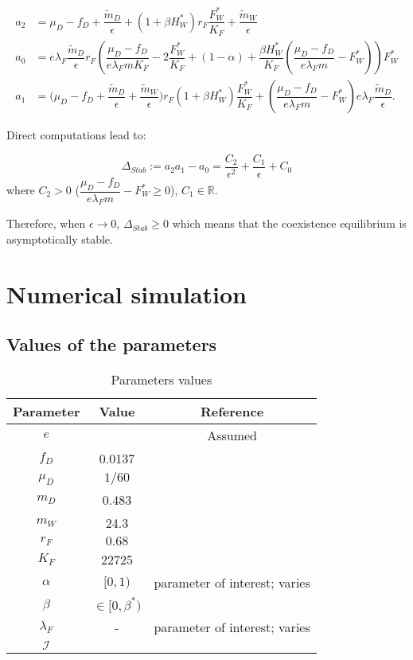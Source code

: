 \documentclass{article}
\newcommand{\lfw}{\lambda_{F}}
\newcommand{\lfw}{\lambda_{F}}
\begin{document}
\begin{align*}
a_2  &= \mu_D - f_D + \dfrac{\tilde m_D}{\epsilon} + (1+\beta H_W^*)r_F \dfrac{F_W^*}{K_F} + \dfrac{\tilde m_W}{\epsilon} \\
a_0 &= e \lfw \dfrac{\tilde m_D}{\epsilon} r_F \left(\dfrac{\mu_D -f_D }{e \lfw m K_F} - 2\dfrac{F_W^*}{K_F} + (1-\alpha) + \dfrac{\beta H_W^*}{K_F} \left(\dfrac{\mu_D -f_D }{e \lfw m} - F_W^*\right) \right) F_W^* \\
a_1 &= \Big( \mu_D  -f_D + \dfrac{\tilde m_D}{\epsilon} + \dfrac{\tilde m_W}{\epsilon} \Big) r_F(1+ \beta H_W^*) \dfrac{F^*_W}{K_F} + \left(\dfrac{\mu_D -f_D}{e\lfw m} - F_W^*\right) e \lfw \dfrac{\tilde m_D}{\epsilon}.
\end{align*}

Direct computations lead to:

\begin{equation*}
\Delta_{Stab} := a_2 a_1 - a_0 = \dfrac{C_2}{\epsilon^2} + \dfrac{C_1}{\epsilon} + C_0
\end{equation*}
where $C_2 > 0$ ($\dfrac{\mu_D -f_D}{e\lfw m} - F_W^* \geq 0$), $C_1 \in \mathbb{R}$.


Therefore, when $\epsilon \rightarrow 0$, $\Delta_{Stab} \geq 0$ which means that the coexistence equilibrium is asymptotically stable.









\section{Numerical simulation}

\subsection{Values of the parameters}

\begin{table}[ht]
\centering
\begin{tabular}{|c|c|c|}
\hline 
Parameter & Value & Reference \\ 
\hline 
$e$ & & Assumed\\
$f_D$ & 0.0137 & \cite{koppert_consommation_1996}\\
$\mu_D$ & $1/60$ & \cite{ins_demographie}\\
$m_D$ & 0.483 & \cite{avila_interpreting_2019}\\
$m_W$ & 24.3 & \cite{avila_interpreting_2019}\\
$r_F$ & $0.68$ & \cite{robinson_intrinsic_1986}\\
$K_F$ & 22725 & \cite{janson_ecological_1990} \\
$\alpha$ & $[0, 1)$ & parameter of interest; varies \\
$\beta$ & $\in [0, \beta^*)$ &  \\
$\lfw$ & - & parameter of interest; varies \\
$\mathcal{I}$ &  & \\
\hline
\end{tabular}
\caption{Parameters values}
\end{table}
\end{document}
